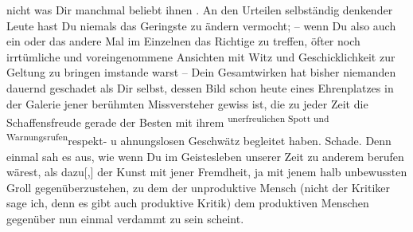                nicht was Dir manchmal beliebt ihnen \label{K_L03521-11v}\label{K_L03521-11}. An den
               Urteilen selbständig denkender Leute hast Du niemals das Geringste zu ändern
               vermocht; – wenn Du also auch ein oder das andere Mal im Einzelnen das Richtige zu
               treffen, öfter noch irrtümliche und voreingenommene Ansichten mit Witz und
               Geschicklichkeit zur Geltung zu bringen imstande warst – Dein Gesamtwirken hat bisher
               niemanden dauernd geschadet als Dir selbst, dessen Bild schon heute eines
               Ehrenplatzes in der Galerie jener berühmten Missversteher gewiss ist, die zu jeder
               Zeit die Schaffensfreude gerade der Besten mit ihrem \substVorne{}\textsuperscript{unerfreulichen Spott und Warnungsrufen}\substDazwischen{}respekt- u ahnungslosen Geschwätz\substHinten{} begleitet haben. Schade. Denn einmal sah es aus, wie wenn Du im Geistesleben
               unserer Zeit zu anderem berufen wärest, als
                  dazu{[},{]} der Kunst mit jener
               Fremdheit, ja mit jenem halb unbewussten Groll gegenüberzustehen, zu dem der
               unproduktive Mensch (nicht der Kritiker sage ich, denn es gibt auch produktive
               Kritik) dem produktiven Menschen gegenüber nun einmal verdammt zu {\pb}sein scheint.\pend
           
